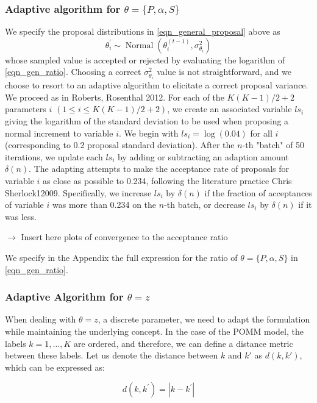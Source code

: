 \documentclass[11pt]{amsart}
\begin{document}
\subsubsection{Adaptive algorithm for $\theta = \{ P, \alpha, S \}$}

We specify the proposal distributions in \eqref{eqn_general_proposal} above as $$\theta_i^{\prime} \sim \operatorname{Normal}\left( \theta_i^{(t-1)}, \sigma_{\theta_i}^2 \right)$$ whose sampled value is accepted or rejected by evaluating the logarithm of \eqref{eqn_gen_ratio}. Choosing a correct $\sigma_{\theta_i}^2 $ value is not straightforward, and we choose to resort to an adaptive algorithm to elicitate a correct proposal variance. We proceed as in Roberts, Rosenthal 2012. For each of the $K(K-1)/2 + 2$ parameters \(i\) \((1 \leq i \leq K(K-1)/2 + 2)\), we create an associated variable \(ls_i\) giving the logarithm of the standard deviation to be used when proposing a normal increment to variable \(i\). We begin with \(ls_i = \log{(0.04)}\) for all \(i\) (corresponding to 0.2 proposal standard deviation). After the \(n\)-th "batch" of 50 iterations, we update each \(ls_i\) by adding or subtracting an adaption amount \(\delta(n)\). The adapting attempts to make the acceptance rate of proposals for variable \(i\) as close as possible to 0.234, following the literature practice Chris Sherlock12009. Specifically, we increase \(ls_i\) by \(\delta(n)\) if the fraction of acceptances of variable \(i\) was more than 0.234 on the \(n\)-th batch, or decrease \(ls_i\) by \(\delta(n)\) if it was less.

$\rightarrow$ Insert here plots of convergence to the acceptance ratio

We specify in the Appendix the full expression for the ratio of $\theta = \{ P, \alpha, S \}$ in \eqref{eqn_gen_ratio}.

\subsubsection{Adaptive Algorithm for $\theta = { z }$}

When dealing with $\theta = { z }$, a discrete parameter, we need to adapt the formulation while maintaining the underlying concept. In the case of the POMM model, the labels $k = 1, \ldots, K$ are ordered, and therefore, we can define a distance metric between these labels. Let us denote the distance between $k$ and $k'$ as $d(k, k')$, which can be expressed as:

\begin{equation}
d(k, k^\prime) = |k - k^\prime|
\end{equation}
\end{document}
